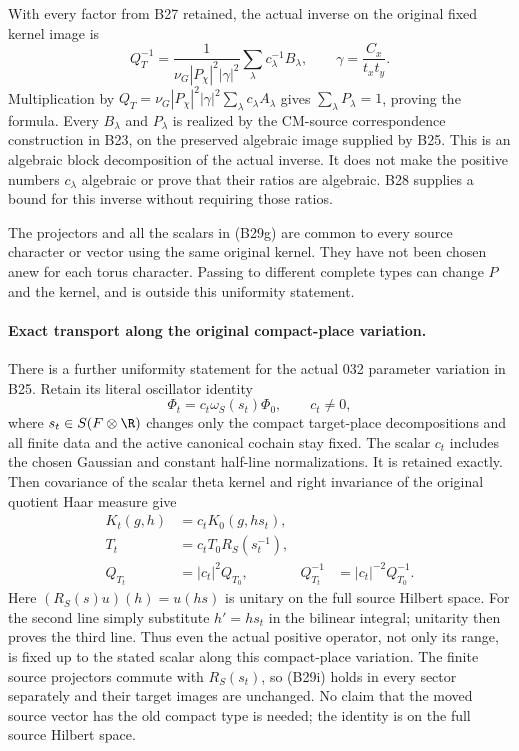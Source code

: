 With every factor from B27 retained, the actual
inverse on the original fixed kernel image is
\[
 \boxed{\displaystyle
  Q_T^{-1}
    =\frac{1}{\nu_G|P_\chi|^2|\gamma|^2}
                 \sum_\lambda c_\lambda^{-1}B_\lambda,
          \qquad \gamma=\frac{C_x}{t_xt_y}.}
 \tag{B29g}
\]
Multiplication by
$Q_T=\nu_G|P_\chi|^2|\gamma|^2
\sum_\lambda c_\lambda A_\lambda$
gives $\sum_\lambda P_\lambda=1$, proving the formula.
Every $B_\lambda$ and $P_\lambda$ is realized by the
CM-source correspondence construction in B23, on
the preserved algebraic image supplied by B25.
This is an algebraic block decomposition of the
actual inverse.  It does not make the positive
numbers $c_\lambda$ algebraic or prove that their
ratios are algebraic.  B28 supplies a bound for
this inverse without requiring those ratios.

The projectors and all the scalars in (B29g) are
common to every source character or vector using
the same original kernel.  They have not been
chosen anew for each torus character.  Passing to
different complete types can change $P$ and the
kernel, and is outside this uniformity statement.

\paragraph{Exact transport along the original compact-place variation.}
There is a further uniformity statement for the
actual 032 parameter variation in B25.  Retain its
literal oscillator identity
\[
      \Phi_t=c_t\omega_S(s_t)\Phi_0,
                    \qquad c_t\ne0,
 \tag{B29h}
\]
where $s_t\in S(F\otimes\R)$ changes only the compact
target-place decompositions and all finite data and
the active canonical cochain stay fixed.  The scalar
$c_t$ includes the chosen Gaussian and constant
half-line normalizations.  It is retained exactly.
Then covariance of the scalar theta kernel and
right invariance of the original quotient Haar
measure give
\[
 \begin{aligned}
 K_t(g,h)&=c_tK_0(g,hs_t),\\
 T_t&=c_tT_0 R_S(s_t^{-1}),\\
 Q_{T_t}&=|c_t|^2Q_{T_0},
      &Q_{T_t}^{-1}&=|c_t|^{-2}Q_{T_0}^{-1}.
 \end{aligned}
 \tag{B29i}
\]
Here $(R_S(s)u)(h)=u(hs)$ is unitary on the full
source Hilbert space.  For the second line simply
substitute $h'=hs_t$ in the bilinear integral;
unitarity then proves the third line.  Thus even
the actual positive operator, not only its range,
is fixed up to the stated scalar along this
compact-place variation.  The finite source
projectors commute with $R_S(s_t)$, so (B29i)
holds in every sector separately and their target
images are unchanged.  No claim that the moved
source vector has the old compact type is needed;
the identity is on the full source Hilbert space.

